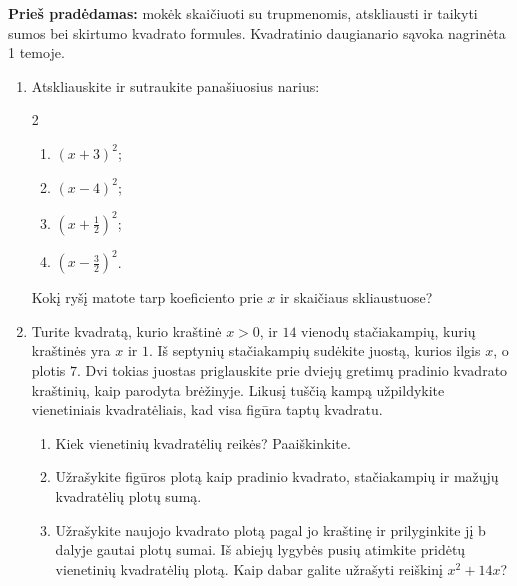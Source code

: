 \documentclass[12pt,a4paper]{article}
\begin{document}
\textbf{Prieš pradėdamas:} mokėk skaičiuoti su trupmenomis, atskliausti ir taikyti sumos bei skirtumo kvadrato formules. Kvadratinio daugianario sąvoka nagrinėta 1 temoje.

\begin{enumerate}
\item Atskliauskite ir sutraukite panašiuosius narius:
\begin{multicols}{2}\begin{enumerate}
\item $(x+3)^2$; \item $(x-4)^2$; \item $(x+\frac{1}{2})^2$; \item $(x-\frac{3}{2})^2$.
\end{enumerate}\end{multicols}
Kokį ryšį matote tarp koeficiento prie $x$ ir skaičiaus skliaustuose?
\item Turite kvadratą, kurio kraštinė $x>0$, ir $14$ vienodų stačiakampių, kurių kraštinės yra $x$ ir $1$. Iš septynių stačiakampių sudėkite juostą, kurios ilgis $x$, o plotis $7$. Dvi tokias juostas priglauskite prie dviejų gretimų pradinio kvadrato kraštinių, kaip parodyta brėžinyje. Likusį tuščią kampą užpildykite vienetiniais kvadratėliais, kad visa figūra taptų kvadratu.
\begin{center}
\end{center}
\begin{enumerate}
\item Kiek vienetinių kvadratėlių reikės? Paaiškinkite.
\item Užrašykite figūros plotą kaip pradinio kvadrato, stačiakampių ir mažųjų kvadratėlių plotų sumą.
\item Užrašykite naujojo kvadrato plotą pagal jo kraštinę ir prilyginkite jį b dalyje gautai plotų sumai. Iš abiejų lygybės pusių atimkite pridėtų vienetinių kvadratėlių plotą. Kaip dabar galite užrašyti reiškinį $x^2+14x$?

\end{enumerate}
\end{enumerate}
\end{document}
